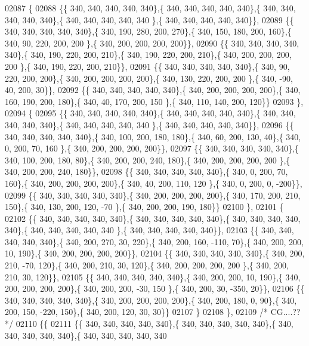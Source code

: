 \begin{DoxyCode}
02087 \{
02088 \{\{ 340, 340, 340, 340, 340\},\{ 340, 340, 340, 340, 340\},\{ 340, 340, 340, 340, 340\},\{ 340, 340, 340, 340, 340
      \},\{ 340, 340, 340, 340, 340\}\},
02089 \{\{ 340, 340, 340, 340, 340\},\{ 340, 190, 280, 200, 270\},\{ 340, 150, 180, 200, 160\},\{ 340,  90, 220, 200, 200
      \},\{ 340, 200, 200, 200, 200\}\},
02090 \{\{ 340, 340, 340, 340, 340\},\{ 340, 190, 220, 200, 210\},\{ 340, 190, 220, 200, 210\},\{ 340, 200, 200, 200, 200
      \},\{ 340, 190, 220, 200, 210\}\},
02091 \{\{ 340, 340, 340, 340, 340\},\{ 340,  90, 220, 200, 200\},\{ 340, 200, 200, 200, 200\},\{ 340, 130, 220, 200, 200
      \},\{ 340, -90,  40, 200,  30\}\},
02092 \{\{ 340, 340, 340, 340, 340\},\{ 340, 200, 200, 200, 200\},\{ 340, 160, 190, 200, 180\},\{ 340,  40, 170, 200, 150
      \},\{ 340, 110, 140, 200, 120\}\}
02093 \},
02094 \{
02095 \{\{ 340, 340, 340, 340, 340\},\{ 340, 340, 340, 340, 340\},\{ 340, 340, 340, 340, 340\},\{ 340, 340, 340, 340, 340
      \},\{ 340, 340, 340, 340, 340\}\},
02096 \{\{ 340, 340, 340, 340, 340\},\{ 340, 100, 200, 180, 180\},\{ 340,  60, 200, 130,  40\},\{ 340,   0, 200,  70, 160
      \},\{ 340, 200, 200, 200, 200\}\},
02097 \{\{ 340, 340, 340, 340, 340\},\{ 340, 100, 200, 180,  80\},\{ 340, 200, 200, 240, 180\},\{ 340, 200, 200, 200, 200
      \},\{ 340, 200, 200, 240, 180\}\},
02098 \{\{ 340, 340, 340, 340, 340\},\{ 340,   0, 200,  70, 160\},\{ 340, 200, 200, 200, 200\},\{ 340,  40, 200, 110, 120
      \},\{ 340,   0, 200,   0, -200\}\},
02099 \{\{ 340, 340, 340, 340, 340\},\{ 340, 200, 200, 200, 200\},\{ 340, 170, 200, 210, 150\},\{ 340, 130, 200, 120, -70
      \},\{ 340, 200, 200, 190, 180\}\}
02100 \},
02101 \{
02102 \{\{ 340, 340, 340, 340, 340\},\{ 340, 340, 340, 340, 340\},\{ 340, 340, 340, 340, 340\},\{ 340, 340, 340, 340, 340
      \},\{ 340, 340, 340, 340, 340\}\},
02103 \{\{ 340, 340, 340, 340, 340\},\{ 340, 200, 270,  30, 220\},\{ 340, 200, 160, -110,  70\},\{ 340, 200, 200,  10, 
      190\},\{ 340, 200, 200, 200, 200\}\},
02104 \{\{ 340, 340, 340, 340, 340\},\{ 340, 200, 210, -70, 120\},\{ 340, 200, 210,  30, 120\},\{ 340, 200, 200, 200, 200
      \},\{ 340, 200, 210,  30, 120\}\},
02105 \{\{ 340, 340, 340, 340, 340\},\{ 340, 200, 200,  10, 190\},\{ 340, 200, 200, 200, 200\},\{ 340, 200, 200, -30, 150
      \},\{ 340, 200,  30, -350,  20\}\},
02106 \{\{ 340, 340, 340, 340, 340\},\{ 340, 200, 200, 200, 200\},\{ 340, 200, 180,   0,  90\},\{ 340, 200, 150, -220, 
      150\},\{ 340, 200, 120,  30,  30\}\}
02107 \}
02108 \},
02109 \textcolor{comment}{/* CG....?? */}
02110 \{\{
02111 \{\{ 340, 340, 340, 340, 340\},\{ 340, 340, 340, 340, 340\},\{ 340, 340, 340, 340, 340\},\{ 340, 340, 340, 340, 340

\end{DoxyCode}
